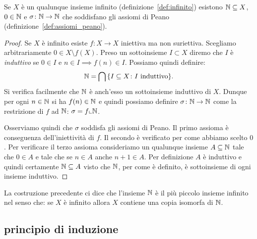 \begin{theorem}
  \label{th:esistenza_naturali}%
Se $X$ è un qualunque insieme infinito (definizione~\ref{def:infinito})
esistono ${\mathbb N}\subseteq X$, $0\in {\mathbb N}$ e $\sigma\colon {\mathbb N}\to{\mathbb N}$ 
che soddisfano gli assiomi di Peano (definizione~\ref{def:assiomi_peano}).
\end{theorem}
%
\begin{proof}
Se $X$ è infinito esiste $f\colon X\to X$ iniettiva ma non suriettiva. 
Scegliamo arbitrariamente $0\in X\setminus f(X)$. 
Preso un sottoinsieme $I\subset X$ diremo che $I$ è \emph{induttivo}
%
%
se $0\in I$ e $n\in I\implies f(n)\in I$. 
Possiamo quindi definire:
\[
  {\mathbb N} = \bigcap {\left\{ I\subseteq X\colon \text{$I$ induttivo} \right\}}.
\]
Si verifica facilmente che ${\mathbb N}$ è anch'esso un sottoinsieme induttivo di $X$.
Dunque per ogni $n\in {\mathbb N}$ si ha $f(n)\in {\mathbb N}$ e quindi possiamo 
definire $\sigma\colon {\mathbb N}\to {\mathbb N}$ come la restrizione di $f$ 
ad ${\mathbb N}$: $\sigma=f\llcorner {\mathbb N}$.

Osserviamo quindi che $\sigma$ soddisfa gli assiomi di Peano.
Il primo assioma è conseguenza dell'iniettività di $f$.
Il secondo è verificato per come abbiamo scelto $0$.
Per verificare il terzo assioma consideriamo un qualunque insieme 
$A\subseteq {\mathbb N}$ tale che $0\in A$ e tale che se $n\in A$ anche $n+1\in A$.
Per definizione $A$ è induttivo e quindi certamente 
${\mathbb N}\subseteq A$ visto che ${\mathbb N}$, per come è definito,
è sottoinsieme di ogni insieme induttivo.
\end{proof}

La costruzione precedente ci dice che l'insieme ${\mathbb N}$ è il più piccolo insieme infinito
nel senso che: se $X$ è infinito allora $X$ contiene una copia isomorfa di ${\mathbb N}$. 

\subsection{principio di induzione}

